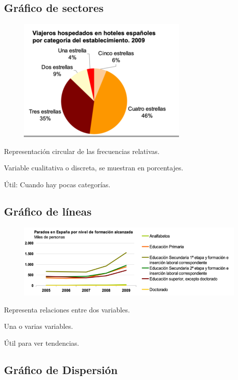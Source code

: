 \documentclass[12pt, twoside, openright]{report} %
\begin{document}
\subsection{Gráfico de sectores}
\vspace{-1cm}
\begin{figure}[H]
	{\includegraphics[scale=.5]{Untitled 8.png}}
\end{figure}

Representación circular de las frecuencias relativas.

Variable cualitativa o discreta, se muestran en porcentajes.

Útil: Cuando hay pocas categorías.

\subsection{Gráfico de líneas}
\begin{figure}[H]
	{\includegraphics[scale=.5]{Untitled 9.png}}
\end{figure}

Representa relaciones entre dos variables.

Una o varias variables.

Útil para ver tendencias.

\subsection{Gráfico de
Dispersión}
\end{document}
